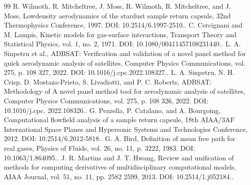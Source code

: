 \documentclass[conference]{IEEEtran}
\begin{document}
\begin{sloppypar}
\begin{thebibliography}{99}
 R. Wilmoth, R. Mitcheltree, J. Moss, R. Wilmoth, R. Mitcheltree, and J. Moss, Lowdensity aerodynamics of the stardust sample return capsule, 32nd Thermophysics Conference, 1997. DOI: 10.2514/6.1997-2510..
 C. Cercignani and M. Lampis, Kinetic models for gas-surface interactions, Transport Theory and Statistical Physics, vol. 1, no. 2, 1971. DOI: 10.1080/00411457108231440..
 L. A. Sinpetru et al., ADBSAT: Verification and validation of a novel panel method for quick aerodynamic analysis of satellites, Computer Physics Communications, vol. 275, p. 108 327, 2022. DOI: 10.1016/j.cpc.2022.108327..
 L. A. Sinpetru, N. H. Crisp, D. Mostaza-Prieto, S. Livadiotti, and P. C. Roberts, ADBSAT: Methodology of A novel panel method tool for aerodynamic analysis of satellites, Computer Physics Communications, vol. 275, p. 108 326, 2022. DOI: 10.1016/j.cpc. 2022.108326..
 G. Pezzella, P. Catalano, and A. Bourgoing, Computational flowfield analysis of a sample return capsule, 18th AIAA/3AF International Space Planes and Hypersonic Systems and Technologies Conference, 2012. DOI: 10.2514/6.2012-5818..
 G. A. Bird, Definition of mean free path for real gases, Physics of Fluids, vol. 26, no. 11, p. 3222, 1983. DOI: 10.1063/1.864095..
 J. R. Martins and J. T. Hwang, Review and unification of methods for computing derivatives of multidisciplinary computational models, AIAA Journal, vol. 51, no. 11, pp. 2582 2599, 2013. DOI: 10.2514/1.j052184..
\end{thebibliography}
\end{sloppypar}
\end{document}
